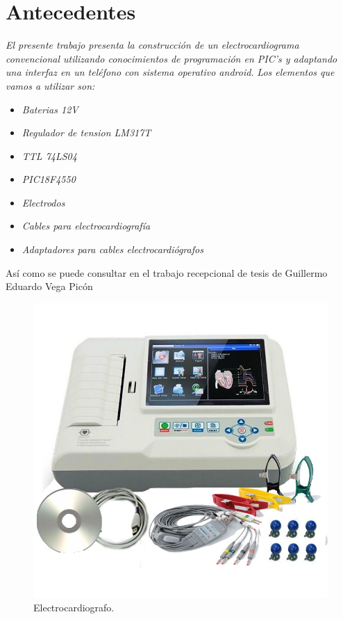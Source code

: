 \chapter{Antecedentes}
\textit{El presente trabajo presenta la construcción de un electrocardiograma convencional utilizando conocimientos de programación en PIC's y adaptando una interfaz en un teléfono con sistema operativo android.}\newline
\textit{Los elementos que vamos a utilizar son:}
\begin{itemize}
\item \textit{Baterias 12V}
\item \textit{Regulador de tension LM317T}
\item \textit{TTL 74LS04}
\item \textit{PIC18F4550}
\item \textit{Electrodos}
\item \textit{Cables para electrocardiografía}
\item \textit{Adaptadores para cables electrocardiógrafos}
\end{itemize}
Así como se puede consultar en el trabajo recepcional de tesis de Guillermo Eduardo Vega Picón

\begin{figure}
   	\centering
		\includegraphics[width=12cm]{imag/electrocardiografo.jpg}
		\caption{Electrocardiografo.}
		\label{cavi}
\end{figure}